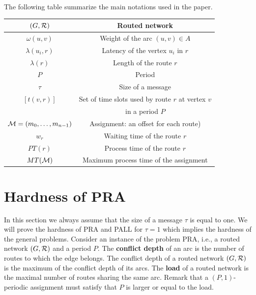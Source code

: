 \documentclass[a4paper,10pt]{article}
\begin{document}
     
      The following table summarize the main notations used in the paper.
      \begin{center}
   \begin{tabular}{|c|c|}
    \hline
     $(G,\cal R)$ & Routed network \\
     \hline
      $\omega(u,v)$ & Weight of the arc $(u,v) \in A$ \\
      \hline
      $\lambda(u_i,r)$ & Latency of the vertex $u_i$ in $r$\\
         \hline
         $\lambda(r)$ & Length of the route $r$\\
         \hline
         $P$ & Period\\
         \hline
         $\tau$ & Size of a message\\
         \hline
         $ [t(v,r)]$& Set of time slots used by route $r$ at vertex $v$ \\
         & in a period $P$\\
         \hline 
         ${\cal M}=(m_0, \ldots ,m_{n-1})$& Assignment: an offset for each route)\\
              \hline 
         $w_r$& Waiting time of the route $r$\\
            \hline 
         $PT(r)$& Process time of the route $r$\\
           \hline 
         $MT({\cal M})$& Maximum process time of the assignment\\
    \hline

      \end{tabular}
      \end{center}


\section{Hardness of PRA}
  \label{sec:complexity}

 In this section we always assume that the size of a message $\tau$ is equal to one. 
 We will prove the hardness of PRA and PALL for $\tau =1$ which implies the hardness of the general problems. 
Consider an instance of the problem PRA, i.e., a routed network $(G,\cal{R})$ and a period $P$.
The {\bf conflict depth} of an arc is the number of routes to which the edge belongs. 
The conflict depth of a routed network $(G,\cal{R})$ is the maximum of the conflict depth of its arcs.
The {\bf load} of a routed network is the maximal number of routes sharing the same arc.
Remark that a $(P,1)$-periodic assignment must satisfy that $P$ is larger or equal to the load.
\end{document}
